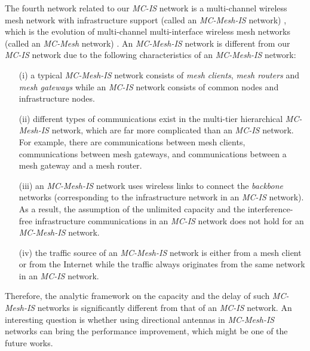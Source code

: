 \documentclass[10pt,journal]{IEEEtran}
\begin{document}
The fourth network related to our \textit{MC-IS} network is a multi-channel wireless mesh network with infrastructure support (called an \textit{MC-Mesh-IS} network) \cite{PZhou:TMC08,Mansoori:WPC13,WFu:TMC13,Mansoori:performance13,Chieochan:TMC2013,Mansoori:TMC2015}, which is the evolution of multi-channel multi-interface wireless mesh networks (called an \textit{MC-Mesh} network) \cite{Akyildiz:2005,Kodialam:2005}. An \textit{MC-Mesh-IS} network is different from our \textit{MC-IS} network due to the following characteristics of an \textit{MC-Mesh-IS} network: 
\begin{itemize}
\item [(i)] a typical \textit{MC-Mesh-IS} network consists of {\it mesh clients}, {\it mesh routers} and {\it mesh gateways} while an \textit{MC-IS} network consists of common nodes and infrastructure nodes.
\item [(ii)] different types of communications exist in the multi-tier hierarchical \textit{MC-Mesh-IS} network, which are far more complicated than an \textit{MC-IS} network. For example, there are communications between mesh clients, communications between mesh gateways, and communications between a mesh gateway and a mesh router.
\item [(iii)] an \textit{MC-Mesh-IS} network uses wireless links to connect the {\it backbone} networks (corresponding to the infrastructure network in an \textit{MC-IS} network). As a result, the assumption of the unlimited capacity and the interference-free infrastructure communications in an \textit{MC-IS} network does not hold for an \textit{MC-Mesh-IS} network.
\item [(iv)] the traffic source of an \textit{MC-Mesh-IS} network is either from a mesh client or from the Internet while the traffic always originates from the same network in an \textit{MC-IS} network.
\end{itemize}

Therefore, the analytic framework on the capacity and the delay of such \textit{MC-Mesh-IS} networks is significantly different from that of an \textit{MC-IS} network. An interesting question is whether using directional antennas in \textit{MC-Mesh-IS} networks can bring the performance improvement, which might be one of the future works.
\end{document}
